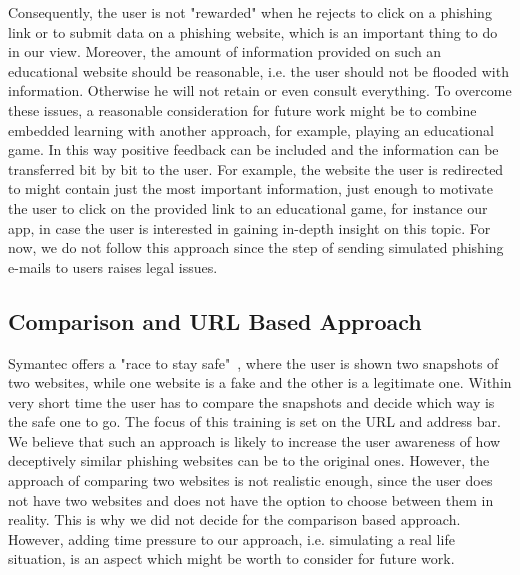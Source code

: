 Consequently, the user is not "rewarded" when he rejects to click on a phishing link or to submit data on a phishing website, which is an important thing to do in our view. 
Moreover, the amount of information provided on such an educational website should be reasonable, i.e. the user should not be flooded with information. 
Otherwise he will not retain or even consult everything. 
To overcome these issues, a reasonable consideration for future work might be to combine embedded learning with another approach, for example, playing an educational game. 
In this way positive feedback can be included and the information can be transferred bit by bit to the user. 
For example, the website the user is redirected to might contain just the most important information, just enough to motivate the user to click on the provided link to an educational game, for instance our app, in case the user is interested in gaining in-depth insight on this topic. 
For now, we do not follow this approach since the step of sending simulated phishing e-mails to users raises legal issues.

\subsection{Comparison and URL Based Approach}
Symantec offers a "race to stay safe"~\cite{staysafeonline}, where the user is shown two snapshots of two websites, while one website is a fake and the other is a legitimate one. 
Within very short time the user has to compare the snapshots and decide which way is the safe one to go. 
The focus of this training is set on the URL and address bar. 
We believe that such an approach is likely to increase the user awareness of how deceptively similar phishing websites can be to the original ones. 
However, the approach of comparing two websites is not realistic enough, since the user does not have two websites and does not have the option to choose between them in reality. 
This is why we did not decide for the comparison based approach. 
However, adding time pressure to our approach, i.e. simulating a real life situation, is an aspect which might be worth to consider for future work.

